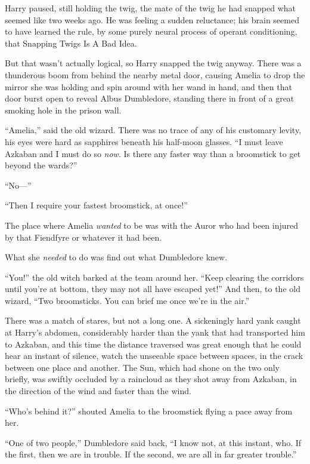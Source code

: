 Harry paused, still holding the twig, the mate of the twig he had snapped what
seemed like two weeks ago. He was feeling a sudden reluctance; his brain seemed
to have learned the rule, by some purely neural process of operant
conditioning, that Snapping Twigs Is A Bad Idea.

But that wasn’t actually logical, so Harry snapped the twig anyway.
\later
There was a thunderous boom from behind the nearby metal door, causing Amelia
to drop the mirror she was holding and spin around with her wand in hand, and
then that door burst open to reveal Albus Dumbledore, standing there in front
of a great smoking hole in the prison wall.

“Amelia,” said the old wizard. There was no trace of any of his customary
levity, his eyes were hard as sapphires beneath his half-moon glasses. “I must
leave Azkaban and I must do so \emph{now}. Is there any faster way than a
broomstick to get beyond the wards?”

“No—”

“Then I require your fastest broomstick, at once!”

The place where Amelia \emph{wanted} to be was with the Auror who had been
injured by that Fiendfyre or whatever it had been.

What she \emph{needed} to do was find out what Dumbledore knew.

“You!” the old witch barked at the team around her. “Keep clearing the
corridors until you’re at bottom, they may not all have escaped yet!” And then,
to the old wizard, “Two broomsticks. You can brief me once we’re in the air.”

There was a match of stares, but not a long one.
\later
A sickeningly hard yank caught at Harry’s abdomen, considerably harder than the
yank that had transported him to Azkaban, and this time the distance traversed
was great enough that he could hear an instant of silence, watch the unseeable
space between spaces, in the crack between one place and another.
\later
The Sun, which had shone on the two only briefly, was swiftly occluded by a
raincloud as they shot away from Azkaban, in the direction of the wind and
faster than the wind.

“Who’s behind it?” shouted Amelia to the broomstick flying a pace away from her.

“One of two people,” Dumbledore said back, “I know not, at this instant, who.
If the first, then we are in trouble. If the second, we are all in far greater
trouble.”

